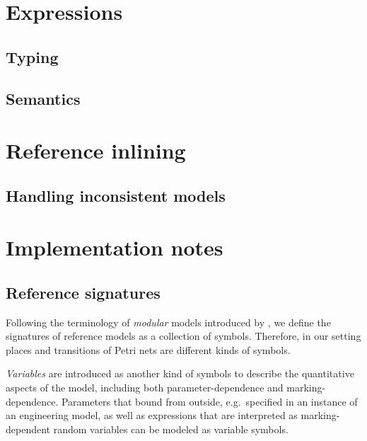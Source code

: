 \section{Expressions}
\label{sec:rgspn:expression}

\subsection{Typing}

\subsection{Semantics}
\label{ssec:rgspn:semantics}

\section{Reference inlining}
\label{sec:rgspn:inlining}

\subsection{Handling inconsistent models}
\label{ssec:rgspn:inconsistent}

\section{Implementation notes}


\subsection{Reference  signatures}

Following the terminology of \emph{modular } models introduced by \citet{Kindler01modular}, we define the signatures of reference  models as a collection of symbols. Therefore, in our setting places and transitions of Petri nets are different kinds of symbols.

\emph{Variables} are introduced as another kind of symbols to describe the quantitative aspects of the model, including both parameter-dependence and marking-dependence. Parameters that bound from outside, e.g.\ specified in an instance of an engineering model, as well as expressions that are interpreted as marking-dependent random variables can be modeled as variable symbols.

